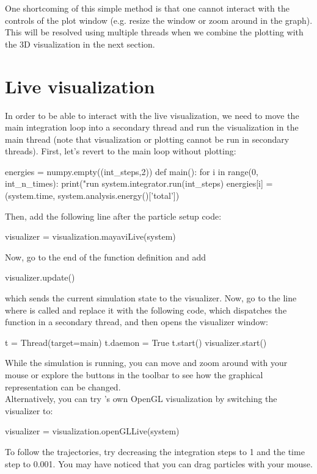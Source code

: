 \documentclass[
paper=a4,                       %
fontsize=11pt,                  %
twoside,                        %
footsepline,                    %
headsepline,                    %
headinclude=false,              %
footinclude=false,              %
pagesize,                       %
]{scrartcl}
\begin{document}
\noindent One shortcoming of this simple method is that one cannot interact with the controls of the plot window (e.g. resize the window or zoom around in the graph).
This will be resolved using multiple threads when we combine the plotting with the 3D visualization in the next section.

\section{Live visualization}
\label{vis}

In order to be able to interact with the live visualization, we need to move the main integration loop into a secondary thread and run the visualization in the main thread (note that visualization or plotting cannot be run in secondary threads). First, let's revert to the main loop without plotting:
\begin{pypresso}
energies = numpy.empty((int_steps,2))
def main():
    for i in range(0, int_n_times):
        print("run %
        system.integrator.run(int_steps)
        energies[i] = (system.time, system.analysis.energy()['total'])
\end{pypresso}

Then, add the following line after the particle setup code:
\begin{pypresso}
visualizer = visualization.mayaviLive(system)
\end{pypresso}
Now, go to the end of the  function definition and add
\begin{pypresso}
visualizer.update()
\end{pypresso}
which sends the current simulation state to the visualizer.
Now, go to the line where  is called and replace it with the following code, which dispatches the function in a secondary thread, and then opens the visualizer window:
\begin{pypresso}
t = Thread(target=main)
t.daemon = True
t.start()
visualizer.start()
\end{pypresso}
While the simulation is running, you can move and zoom around with your mouse or explore the buttons in the toolbar to see how the graphical representation can be changed.\\

\noindent Alternatively, you can try \es's own OpenGL visualization by switching the visualizer to:
\begin{pypresso}
visualizer = visualization.openGLLive(system)
\end{pypresso}
To follow the trajectories, try decreasing the integration steps to 1 and the time step to 0.001. 
You may have noticed that you can drag particles with your mouse. 
\end{document}
